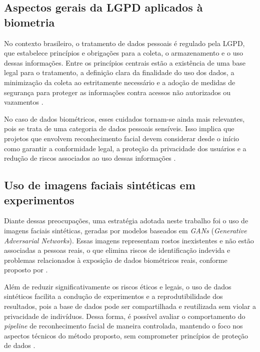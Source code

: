 \subsection{Aspectos gerais da LGPD aplicados à biometria}

No contexto brasileiro, o tratamento de dados pessoais é regulado pela \acs{LGPD}, que estabelece princípios e obrigações para a coleta, o armazenamento e o uso dessas informações. Entre os princípios centrais estão a existência de uma base legal para o tratamento, a definição clara da finalidade do uso dos dados, a minimização da coleta ao estritamente necessário e a adoção de medidas de segurança para proteger as informações contra acessos não autorizados ou vazamentos \cite{lgpd2018lei}.

No caso de dados biométricos, esses cuidados tornam-se ainda mais relevantes, pois se trata de uma categoria de dados pessoais sensíveis. Isso implica que projetos que envolvem reconhecimento facial devem considerar desde o início como garantir a conformidade legal, a proteção da privacidade dos usuários e a redução de riscos associados ao uso dessas informações \cite{lgpd2018lei}.

\subsection{Uso de imagens faciais sintéticas em experimentos}

Diante dessas preocupações, uma estratégia adotada neste trabalho foi o uso de imagens faciais sintéticas, geradas por modelos baseados em \textit{GANs} (\textit{Generative Adversarial Networks}). Essas imagens representam rostos inexistentes e não estão associadas a pessoas reais, o que elimina riscos de identificação indevida e problemas relacionados à exposição de dados biométricos reais, conforme proposto por \textcite{goodfellow2020gan}.

Além de reduzir significativamente os riscos éticos e legais, o uso de dados sintéticos facilita a condução de experimentos e a reprodutibilidade dos resultados, pois a base de dados pode ser compartilhada e reutilizada sem violar a privacidade de indivíduos. Dessa forma, é possível avaliar o comportamento do \textit{pipeline} de reconhecimento facial de maneira controlada, mantendo o foco nos aspectos técnicos do método proposto, sem comprometer princípios de proteção de dados \cite{edps_synthetic_data}.


